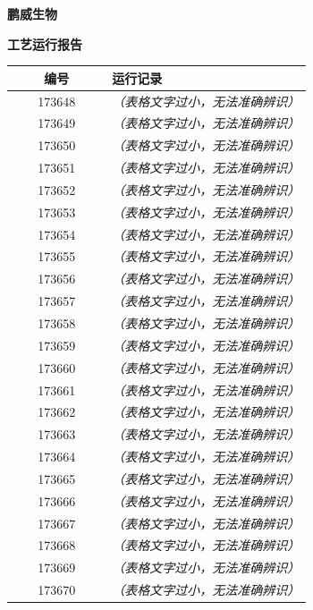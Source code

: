 \documentclass[UTF8,10pt,a4paper,fontset=fandol]{ctexart}
\begin{document}

\newpage

\noindent
\begin{minipage}[t]{0.48\textwidth}
\centering
\textbf{鹏威生物}\par
\vspace{1mm}
\textbf{工艺运行报告}\par
\vspace{1mm}
\begin{tabular}{|c|p{0.67\linewidth}|}
\hline
\textbf{编号} & \textbf{运行记录} \\ \hline
173648 & \textit{（表格文字过小，无法准确辨识）} \\ \hline
173649 & \textit{（表格文字过小，无法准确辨识）} \\ \hline
173650 & \textit{（表格文字过小，无法准确辨识）} \\ \hline
173651 & \textit{（表格文字过小，无法准确辨识）} \\ \hline
173652 & \textit{（表格文字过小，无法准确辨识）} \\ \hline
173653 & \textit{（表格文字过小，无法准确辨识）} \\ \hline
173654 & \textit{（表格文字过小，无法准确辨识）} \\ \hline
173655 & \textit{（表格文字过小，无法准确辨识）} \\ \hline
173656 & \textit{（表格文字过小，无法准确辨识）} \\ \hline
173657 & \textit{（表格文字过小，无法准确辨识）} \\ \hline
173658 & \textit{（表格文字过小，无法准确辨识）} \\ \hline
173659 & \textit{（表格文字过小，无法准确辨识）} \\ \hline
173660 & \textit{（表格文字过小，无法准确辨识）} \\ \hline
173661 & \textit{（表格文字过小，无法准确辨识）} \\ \hline
173662 & \textit{（表格文字过小，无法准确辨识）} \\ \hline
173663 & \textit{（表格文字过小，无法准确辨识）} \\ \hline
173664 & \textit{（表格文字过小，无法准确辨识）} \\ \hline
173665 & \textit{（表格文字过小，无法准确辨识）} \\ \hline
173666 & \textit{（表格文字过小，无法准确辨识）} \\ \hline
173667 & \textit{（表格文字过小，无法准确辨识）} \\ \hline
173668 & \textit{（表格文字过小，无法准确辨识）} \\ \hline
173669 & \textit{（表格文字过小，无法准确辨识）} \\ \hline
173670 & \textit{（表格文字过小，无法准确辨识）} \\ \hline
\end{tabular}
\end{minipage}
\end{document}
